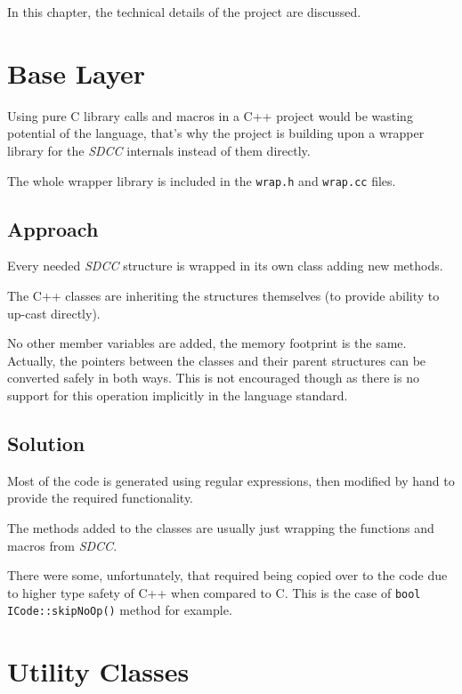 In this chapter, the technical details of the project are discussed.


    \section{Base Layer}

    Using pure C library calls and macros in a C++ project would be wasting potential of the language, that's why the project is building upon a wrapper library for the \emph{SDCC} internals instead of them directly.

    The whole wrapper library is included in the \texttt{wrap.h} and \texttt{wrap.cc} files.

        \subsection{Approach}

        Every needed \emph{SDCC} structure is wrapped in its own class adding new methods.

        The C++ classes are inheriting the structures themselves (to provide ability to up-cast directly).

        No other member variables are added, the memory footprint is the same. Actually, the pointers between the classes and their parent structures can be converted safely in both ways. This is not encouraged though as there is no support for this operation implicitly in the language standard.

        \subsection{Solution}

        Most of the code is generated using regular expressions, then modified by hand to provide the required functionality.

        The methods added to the classes are usually just wrapping the functions and macros from \emph{SDCC}.

        There were some, unfortunately, that required being copied over to the code due to higher type safety of C++ when compared to C. This is the case of \texttt{bool ICode::skipNoOp()} method for example.

    \section{Utility Classes}


